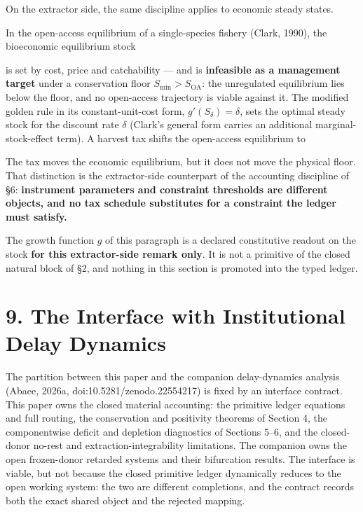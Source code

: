 \documentclass[11pt]{article}
\begin{document}
On the extractor side, the same discipline applies to economic steady states.

In the open-access equilibrium of a single-species fishery (Clark, 1990), the bioeconomic equilibrium stock

is set by cost, price and catchability --- and is \textbf{infeasible as a management target} under a conservation floor \(S_{\min}>S_{\mathrm{OA}}\): the unregulated equilibrium lies below the floor, and no open-access trajectory is viable against it. The modified golden rule in its constant-unit-cost form, \(g'(S_\delta)=\delta\), sets the optimal steady stock for the discount rate \(\delta\) (Clark's general form carries an additional marginal-stock-effect term). A harvest tax shifts the open-access equilibrium to

The tax moves the economic equilibrium, but it does not move the physical floor. That distinction is the extractor-side counterpart of the accounting discipline of \S6: \textbf{instrument parameters and constraint thresholds are different objects, and no tax schedule substitutes for a constraint the ledger must satisfy.}

The growth function \(g\) of this paragraph is a declared constitutive readout on the stock \textbf{for this extractor-side remark only}. It is not a primitive of the closed natural block of \S2, and nothing in this section is promoted into the typed ledger.

\section*{9. The Interface with Institutional Delay Dynamics}\label{9-the-interface-with-institutional-delay-dynamics}

The partition between this paper and the companion delay-dynamics analysis (Abaee, 2026a, doi:10.5281/\allowbreak{}zenodo.22554217) is fixed by an interface contract. This paper owns the closed material accounting: the primitive ledger equations and full routing, the conservation and positivity theorems of Section 4, the componentwise deficit and depletion diagnostics of Sections 5--6, and the closed-donor no-rest and extraction-integrability limitations. The companion owns the open frozen-donor retarded systems and their bifurcation results. The interface is viable, but not because the closed primitive ledger dynamically reduces to the open working system: the two are different completions, and the contract records both the exact shared object and the rejected mapping.
\end{document}

